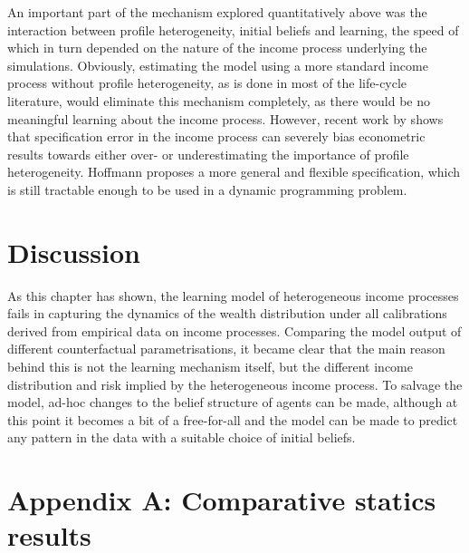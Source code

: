 An important part of the mechanism explored quantitatively above was the interaction 
between profile heterogeneity, initial beliefs and learning, the speed of which 
in turn depended on the nature of the income process underlying the simulations. 
Obviously, estimating the model using a more standard income process without 
profile heterogeneity, as is done in most of the life-cycle literature, would 
eliminate this mechanism completely, as there would be no meaningful learning 
about the income process. However, recent work by \citet{Hoffmann2013} shows 
that specification error in the income process can severely bias econometric
 results towards either over- or underestimating the importance of profile 
heterogeneity. Hoffmann proposes a more general and flexible specification, 
which is still tractable enough to be used in a dynamic programming problem.

\pagebreak
\section{Discussion}\label{sec:discussion}
As this chapter has shown, the learning model of heterogeneous income processes
fails in capturing the dynamics of the wealth distribution under all calibrations
derived from empirical data on income processes. Comparing the model output of 
different counterfactual parametrisations, it became clear that the main reason
behind this is not the learning mechanism itself, but the different income 
distribution and risk implied by the heterogeneous income process. To salvage 
the model, ad-hoc changes to the belief structure of agents can be made, although
at this point it becomes a bit of a free-for-all and the model can be made to
predict any pattern in the data with a suitable choice of initial beliefs.


\section{Appendix A: Comparative statics results}

